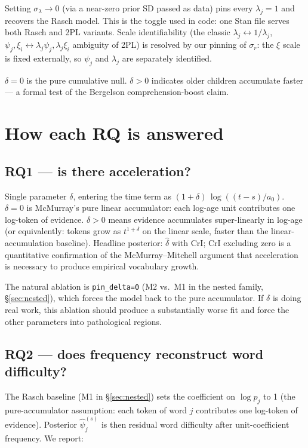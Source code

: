\documentclass[11pt]{article}
\begin{document}
Setting \(\sigma_\lambda \to 0\) (via a near-zero prior SD passed as data)
pins every \(\lambda_j = 1\) and recovers the Rasch model. This is the
toggle used in code: one Stan file serves both Rasch and 2PL variants.
Scale identifiability (the classic \(\lambda_j \leftrightarrow 1/\lambda_j\),
\(\psi_j, \xi_i \leftrightarrow \lambda_j \psi_j, \lambda_j \xi_i\)
ambiguity of 2PL) is resolved by our pinning of \(\sigma_r\): the
\(\xi\) scale is fixed externally, so \(\psi_j\) and \(\lambda_j\) are
separately identified.

\(\delta = 0\) is the pure cumulative null. \(\delta > 0\) indicates older
children accumulate faster — a formal test of the Bergelson
comprehension-boost claim.

\section{How each RQ is answered}

\subsection*{RQ1 — is there acceleration?}

Single parameter \(\delta\), entering the time term as
\((1 + \delta)\,\log\!((t-s)/a_0)\).  \(\delta = 0\) is McMurray's
pure linear accumulator: each log-age unit contributes one log-token of
evidence. \(\delta > 0\) means evidence accumulates super-linearly in
log-age (or equivalently: tokens grow as \(t^{1+\delta}\) on the
linear scale, faster than the linear-accumulation baseline). Headline
posterior: \(\hat\delta\) with CrI; CrI excluding zero is a
quantitative confirmation of the McMurray–Mitchell argument that
acceleration is necessary to produce empirical vocabulary growth.

The natural ablation is \texttt{pin\_delta=0} (M2 vs.\ M1 in the
nested family, §\ref{sec:nested}), which forces the model back to
the pure accumulator. If \(\delta\) is doing real work, this ablation
should produce a substantially worse fit and force the other
parameters into pathological regions.

\subsection*{RQ2 — does frequency reconstruct word difficulty?}

The Rasch baseline (M1 in §\ref{sec:nested}) sets the coefficient on
\(\log p_j\) to 1 (the pure-accumulator assumption: each token of
word \(j\) contributes one log-token of evidence). Posterior
\(\hat\psi_j^{(s)}\) is then residual word difficulty after
unit-coefficient frequency. We report:
\end{document}
